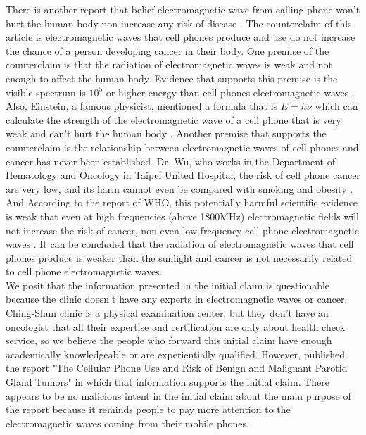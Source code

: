\documentclass[a4paper, 12pt]{article}
\begin{document}
\begin{CJK*}{UTF8}{bsmi}
    There is another report that belief electromagnetic wave from
    calling phone won't hurt the human body non increase any
    risk of disease \parencite{20210822} . The counterclaim of
    this article is electromagnetic waves that cell phones
    produce and use do not increase the chance of a person
    developing cancer in their body. One premise of the counterclaim
    is that the radiation of electromagnetic waves is weak
    and not enough to affect the human body. Evidence that supports
    this premise is the visible spectrum is $10^5$ or higher
    energy than cell phones electromagnetic waves
    \parencite{20210822} . Also, Einstein, a famous physicist,
    mentioned a formula that is $E=h\nu$ which can calculate
    the strength of the electromagnetic wave of a cell
    phone that is very weak and can't hurt the human body
    \parencite{Einstein} .
    Another premise that supports the
    counterclaim is the relationship between electromagnetic
    waves of cell phones and cancer has never been established.
    Dr. Wu, who works in the Department of Hematology and Oncology
    in Taipei United Hospital, the risk of cell phone cancer are
    very low, and its harm cannot even be compared with smoking
    and obesity \parencite{mp109151} . And According to the
    report of WHO, this potentially harmful scientific
    evidence is weak that even at high frequencies (above 1800MHz)
    electromagnetic fields will not increase the risk of
    cancer, non-even low-frequency cell phone electromagnetic
    waves \parencite{nhri} .
    It can be concluded that the radiation of electromagnetic
    waves that cell phones produce is weaker than the sunlight
    and cancer is not necessarily related to cell phone
    electromagnetic waves.\\

    We posit that the information presented in the initial claim
    is questionable because the clinic doesn't have any
    experts in electromagnetic waves or cancer. Ching-Shun
    clinic is a physical examination center, but they don't have
    an oncologist that all their expertise and certification are
    only about health check service, so we believe the people
    who forward this initial claim have enough academically
    knowledgeable or are experientially qualified. However,
    \parencite{10.1093/aje/kwm325} published the report "The
    Cellular Phone Use and Risk of Benign and Malignant Parotid
    Gland Tumors" in which that information supports
    the initial claim.
    There appears to be no malicious intent in the initial claim
    about the main purpose of the report because it reminds people
    to pay more attention to the electromagnetic waves coming from
    their mobile phones.\\


\end{CJK*}
\end{document}
